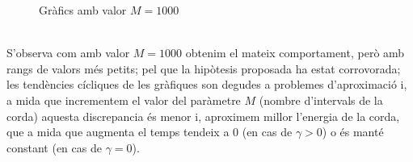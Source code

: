 \documentclass[a4paper, 11pt]{article}
\begin{document}
\begin{figure}[h]
\captionsetup[subfigure]{labelformat=empty}
\centering
   \caption{Gràfics amb valor $M = 1000$}
\end{figure}
\hspace{-1.6em}\\S'observa com amb valor $M=1000$ obtenim el mateix comportament, però amb rangs de valors més petits; pel que la hipòtesis proposada ha estat corrovorada; les tendències cícliques de les gràfiques son degudes a problemes d'aproximació i, a mida que incrementem el valor del paràmetre $M$ (nombre d'intervals de la corda) aquesta discrepancia és menor i, aproximem millor l'energia de la corda, que a mida que augmenta el temps tendeix a 0 (en cas de $\gamma > 0$) o és manté constant (en cas de $\gamma = 0$).\\\\

\newpage
\end{document}
